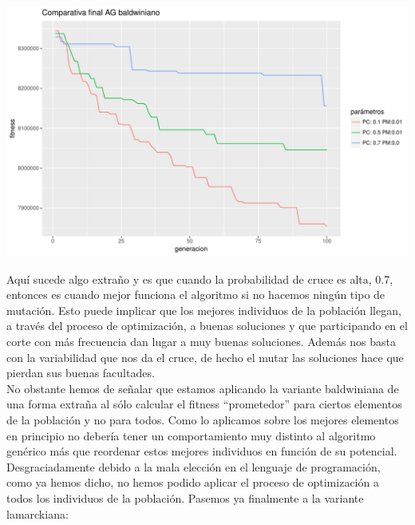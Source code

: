 \documentclass[10pt,a4paper]{article}
\begin{document}
\includegraphics[width = \textwidth]{img/graphics/GAbaldwinFinal.pdf}

Aquí sucede algo extraño y es que cuando la probabilidad de cruce es alta, 0.7, entonces es cuando mejor funciona el algoritmo si no hacemos ningún tipo de mutación. Esto puede implicar que los mejores individuos de la población llegan, a través del proceso de optimización, a buenas soluciones y que participando en el corte con más frecuencia dan lugar a muy buenas soluciones. Además nos basta con la variabilidad que nos da el cruce, de hecho el mutar las soluciones hace que pierdan sus buenas facultades.\\

No obstante hemos de señalar que estamos aplicando la variante baldwiniana de una forma extraña al sólo calcular el fitness ``prometedor'' para ciertos elementos de la población y no para todos. Como lo aplicamos sobre los mejores elementos en principio no debería tener un comportamiento muy distinto al algoritmo genérico más que reordenar estos mejores individuos en función de su potencial. Desgraciadamente debido a la mala elección en el lenguaje de programación, como ya hemos dicho, no hemos podido aplicar el proceso de optimización a todos los individuos de la población. Pasemos ya finalmente a la variante lamarckiana:\\
\end{document}
